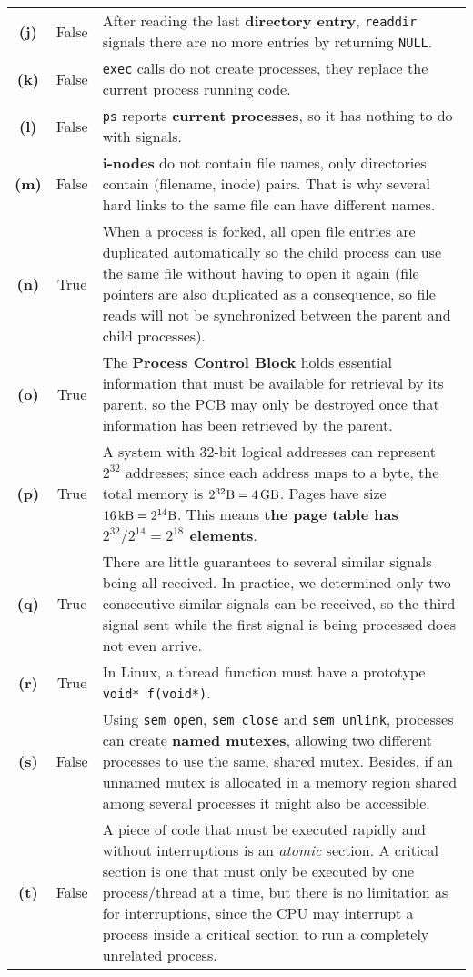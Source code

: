 \documentclass{sope}
\begin{document}
{\begin{center}
\begin{longtable}{c | c p{132mm}}
        \textbf{(j)} & False & After reading the last \textbf{directory entry}, \texttt{readdir} signals there are no more entries by returning \texttt{NULL}. \\
        \textbf{(k)} & False & \texttt{exec} calls do not create processes, they replace the current process running code. \\
        \textbf{(l)} & False & \texttt{ps} reports \textbf{current processes}, so it has nothing to do with signals. \\
        \textbf{(m)} & False & \textbf{i-nodes} do not contain file names, only directories contain (filename, inode) pairs. That is why several hard links to the same file can have different names. \\
        \textbf{(n)} & True & When a process is forked, all open file entries are duplicated automatically so the child process can use the same file without having to open it again (file pointers are also duplicated as a consequence, so file reads will not be synchronized between the parent and child processes). \\
        \textbf{(o)} & True & The \textbf{Process Control Block} holds essential information that must be available for retrieval by its parent, so the PCB may only be destroyed once that information has been retrieved by the parent. \\
        \textbf{(p)} & True & A system with 32-bit logical addresses can represent $2^{32}$ addresses; since each address maps to a byte, the total memory is $2^{32}\SI{}{\byte}=\SI{4}{\giga \byte}$. Pages have size $\SI{16}{\kilo \byte}=2^{14}\SI{}{\byte}$. This means \textbf{the page table has $2^{32}/2^{14}=2^{18}$ elements}. \\
        \textbf{(q)} & True & There are little guarantees to several similar signals being all received. In practice, we determined only two consecutive similar signals can be received, so the third signal sent while the first signal is being processed does not even arrive. \\
        \textbf{(r)} & True & In Linux, a thread function must have a prototype \texttt{void* f(void*)}. \\
        \textbf{(s)} & False & Using \texttt{sem\_open}, \texttt{sem\_close} and \texttt{sem\_unlink}, processes can create \textbf{named mutexes}, allowing two different processes to use the same, shared mutex. Besides, if an unnamed mutex is allocated in a memory region shared among several processes it might also be accessible. \\
        \textbf{(t)} & False & A piece of code that must be executed rapidly and without interruptions is an \emph{atomic} section. A critical section is one that must only be executed by one process/thread at a time, but there is no limitation as for interruptions, since the CPU may interrupt a process inside a critical section to run a completely unrelated process.
    \end{longtable}
\end{center}

}
\end{document}
